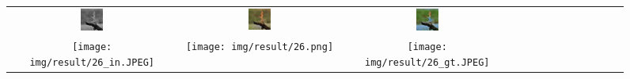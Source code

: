 \documentclass[10pt,twocolumn,letterpaper]{article}
\def\acollumsize{0.14\textwidth}
\begin{document}
\begin{figure}[t!]
\begin{center}
\begin{tabular}{ ccccccccccccc }
\includegraphics[width=\acollumsize]{img/result/16_in.JPEG}&
\includegraphics[width=\acollumsize]{img/result/16.png}&
\includegraphics[width=\acollumsize]{img/result/16_gt.JPEG}& \\

\texttt{[image: img/result/26\_in.JPEG]}&
\texttt{[image: img/result/26.png]}&
\texttt{[image: img/result/26\_gt.JPEG]}& &&



\end{tabular}
\end{center}
\end{figure}
\end{document}
